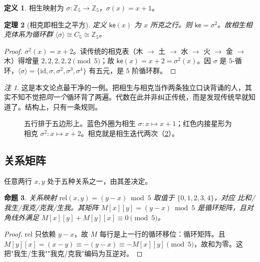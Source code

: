 \documentclass[11pt,a4paper,fontset=none]{ctexart}
\newtheorem{theorem}{定理}[section]
\newtheorem{proposition}[theorem]{命题}
\theoremstyle{definition}
\newtheorem{definition}[theorem]{定义}
\theoremstyle{remark}
\newtheorem*{remark}{注}
\newcommand{\Z}{\mathbb{Z}}
\newcommand{\ke}{\mathsf{ke}}
\begin{document}
\begin{definition}
相生映射为 $\sigma:\Z_5\to\Z_5$，$\sigma(x)=x+1$。
\end{definition}

\begin{theorem}[相克即相生之平方]\label{thm:wuxing}
定义 $\ke(x)$ 为 $x$ 所克之行。则 $\ke=\sigma^2$。故相生相克体系为循环群 $\langle\sigma\rangle\cong C_5\cong\Z_5$。
\end{theorem}
\begin{proof}
$\sigma^2(x)=x+2$。读传统的相克表（木 $\to$ 土 $\to$ 水 $\to$ 火 $\to$ 金 $\to$ 木）得增量 $2,2,2,2,2\pmod 5$；故 $\ke(x)=x+2=\sigma^2(x)$。因 $\sigma$ 是 $5$-循环，$\langle\sigma\rangle=\{\mathrm{id},\sigma,\sigma^2,\sigma^3,\sigma^4\}$ 有五元，是 $5$ 阶循环群。
\end{proof}

\begin{remark}
这是本文论点最干净的一例。把相生与相克当作两条独立口诀背诵的人，其实不知不觉把\emph{同一个}循环背了两遍。代数在此并非纠正传统，而是发现传统早就知道了。结构上，只有一条规则。
\end{remark}

\begin{figure}[h]\centering
{}
\caption{五行排于五边形上。蓝色外圈为相生 $\sigma:x\mapsto x+1$；红色内接星形为相克 $\sigma^2:x\mapsto x+2$。相克就是相生迭代两次（\cref{thm:wuxing}）。}\label{fig:wuxing}
\end{figure}

\subsection{关系矩阵}
任意两行 $x,y$ 处于五种关系之一，由其差决定。
\begin{proposition}\label{prop:relmatrix}
关系映射 $\mathrm{rel}(x,y)=(y-x)\bmod 5$ 取值于 $\{0,1,2,3,4\}$，对应 \emph{比和/我生/我克/克我/生我}。其矩阵 $M[x][y]=(y-x)\bmod 5$ 是循环矩阵，且对角线外满足 $M[x][y]+M[y][x]\equiv0\pmod 5$。
\end{proposition}
\begin{proof}
$\mathrm{rel}$ 只依赖 $y-x$，故 $M$ 每行是上一行的循环移位：循环矩阵。且 $M[y][x]=(x-y)\equiv-(y-x)\equiv -M[x][y]\pmod 5$，故和为零。这把"我生/生我""我克/克我"编码为互逆对。
\end{proof}
\end{document}
